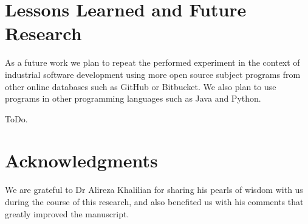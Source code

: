 \documentclass{sig-alternate}
\begin{document}
\section{Lessons Learned and Future Research}
As a future work we plan to repeat the performed experiment in the context of industrial software development using more open source subject programs from other online databases such as GitHub or Bitbucket. We also plan to use programs in other programming languages such as Java and Python.

ToDo.
\section{Acknowledgments}
We are grateful to Dr Alireza Khalilian for sharing his pearls of wisdom with us during the course of this research, and also benefited us with his comments that greatly improved the manuscript.

%

%
%
\end{document}
